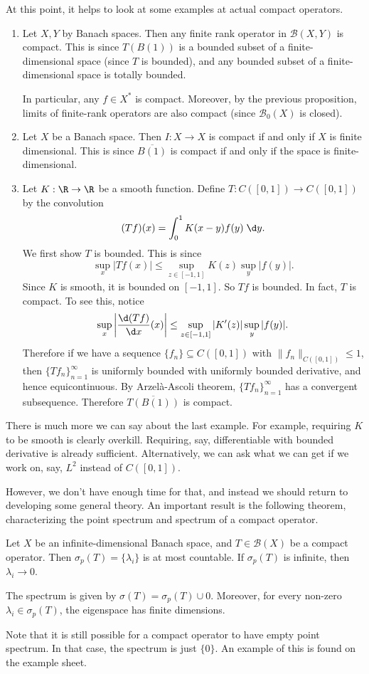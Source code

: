 \documentclass[a4paper]{article}
\begin{document}
At this point, it helps to look at some examples at actual compact operators.
\begin{eg}\leavevmode
  \begin{enumerate}
    \item Let $X, Y$ by Banach spaces. Then any finite rank operator in $\mathcal{B}(X, Y)$ is compact. This is since $T(B(1))$ is a bounded subset of a finite-dimensional space (since $T$ is bounded), and any bounded subset of a finite-dimensional space is totally bounded.

      In particular, any $f \in X^*$ is compact. Moreover, by the previous proposition, limits of finite-rank operators are also compact (since $\mathcal{B}_0(X)$ is closed).
    \item Let $X$ be a Banach space. Then $I: X \to X$ is compact if and only if $X$ is finite dimensional. This is since $\overline{B(1)}$ is compact if and only if the space is finite-dimensional.
    \item Let $K: \R \to \R$ be a smooth function. Define $T: C([0, 1]) \to C([0, 1])$ by the convolution
      \[
        (T f)(x) = \int_0^1 K(x - y) f(y)\;\d y.
      \]
      We first show $T$ is bounded. This is since
      \[
        \sup_x |T f(x)| \leq \sup_{z \in [-1, 1]} K(z) \sup_y |f(y)|.
      \]
      Since $K$ is smooth, it is bounded on $[-1, 1]$. So $Tf$ is bounded. In fact, $T$ is compact. To see this, notice
      \[
        \sup_x \left|\frac{\d (Tf)}{\d x}(x)\right| \leq \sup_{z \in [-1, 1]} |K'(z)| \sup_y |f(y)|.
      \]
      Therefore if we have a sequence $\{f_n\} \subseteq C([0, 1])$ with $\|f_n\|_{C([0, 1])} \leq 1$, then $\{T f_n\}_{n = 1}^\infty$ is uniformly bounded with uniformly bounded derivative, and hence equicontinuous. By Arzel\`a-Ascoli theorem, $\{T f_n\}_{n = 1}^\infty$ has a convergent subsequence. Therefore $\overline{T(B(1))}$ is compact.
  \end{enumerate}
\end{eg}
There is much more we can say about the last example. For example, requiring $K$ to be smooth is clearly overkill. Requiring, say, differentiable with bounded derivative is already sufficient. Alternatively, we can ask what we can get if we work on, say, $L^2$ instead of $C([0, 1])$.

However, we don't have enough time for that, and instead we should return to developing some general theory. An important result is the following theorem, characterizing the point spectrum and spectrum of a compact operator.
\begin{thm}
  Let $X$ be an infinite-dimensional Banach space, and $T \in \mathcal{B}(X)$ be a compact operator. Then $\sigma_p(T) = \{\lambda_i\}$ is at most countable. If $\sigma_p(T)$ is infinite, then $\lambda_i \to 0$.

  The spectrum is given by $\sigma(T) = \sigma_p(T) \cup 0$. Moreover, for every non-zero $\lambda_i \in \sigma_p (T)$, the eigenspace has finite dimensions.
\end{thm}
Note that it is still possible for a compact operator to have empty point spectrum. In that case, the spectrum is just $\{0\}$. An example of this is found on the example sheet.
\end{document}
